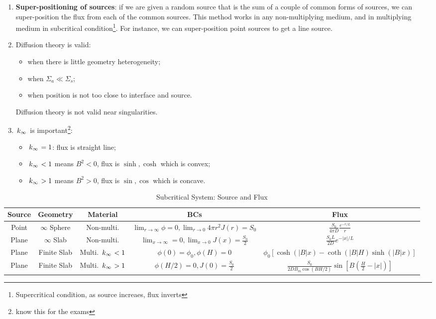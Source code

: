 \documentclass{school-22.211-notes}
\begin{document}
\clearpage
{}
\begin{enumerate}
\item \textbf{Super-positioning of sources}: if we are given a random source that is the sum of a couple of common forms of sources, we can super-position the flux from each of the common sources. This method works in any non-multiplying medium, and in multiplying medium in subcritical condition\footnote{Supercritical condition, as source increaes, flux inverts}. For instance, we can super-position point sources to get a line source. 

\item Diffusion theory is valid: 
  \begin{itemize}
    \item when there is little geometry heterogeneity;
    \item when $\Sigma_a \ll \Sigma_s$;
    \item when position is not too close to interface and source.
  \end{itemize}
  Diffusion theory is not valid near singularities. 

\item $\left. k_{\infty} \right.$ is important\footnote{know this for the exams}: 
  \begin{itemize}
  \item $\left. k_{\infty} \right. = 1$: flux is straight line;
  \item $\left. k_{\infty} \right. < 1$ means $B^2 < 0$, flux is $\sinh, \cosh$ which is convex; 
  \item $\left. k_{\infty} \right. > 1$ means $B^2 > 0$, flux is $\sin, \cos$ which is concave. 
  \end{itemize}
\end{enumerate}

  \begin{table}[ht]
    \centering
    \begin{tabular}{|c|c|c|c|c|} \hline
      Source & Geometry & Material &BCs & Flux \\ \hline \hline
      Point & $\infty$ Sphere & Non-multi.  & $\displaystyle \lim_{r\to\infty} \phi = 0, \lim_{r\to 0} 4 \pi r^2 J(r) = S_0$ & $\displaystyle \frac{S_0}{4\pi D} \frac{e^{-r/L}}{r}$ \\ \hline
      Plane & $\infty$ Slab & Non-multi. &$\displaystyle \lim_{x\to \infty} = 0, \lim_{x \to 0} J(x)  = \frac{S_0}{2}$ & $\displaystyle \frac{S_0 L}{2D} e^{-|x|/L}$ \\ \hline
      Plane & Finite Slab &Multi. $\left. k_{\infty} \right. < 1$ & $\phi(0) = \phi_0, \phi(H) = 0$ & $\displaystyle \phi_0 \left[ \cosh(|B|x) - \coth(|B|H) \sinh(|B| x) \right]$ \\ \hline
      Plane & Finite Slab &Multi. $\left. k_{\infty} \right. > 1$ & $\displaystyle \phi(H/2) = 0, J(0) = \frac{S_0}{2}$ & $\displaystyle \frac{S_0}{2D B_m \cos (BH/2)} \sin \left[ B \left( \frac{H}{2} - |x| \right) \right]$ \\ \hline
    \end{tabular}
    \caption{Subcritical System: Source and Flux} 
  \end{table}
  
  
\end{document}
